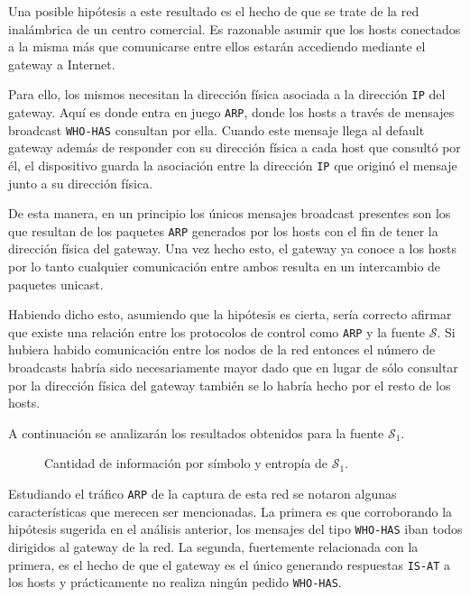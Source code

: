 Una posible hipótesis a este resultado es el hecho de que se trate de la red
inalámbrica de un centro comercial. Es razonable asumir que los hosts conectados
a la misma más que comunicarse entre ellos estarán accediendo mediante el
gateway a Internet.

Para ello, los mismos necesitan la dirección física asociada a la dirección
\texttt{IP} del gateway. Aquí es donde entra en juego \texttt{ARP}, donde los
hosts a través de mensajes broadcast \texttt{WHO-HAS} consultan por ella. Cuando
este mensaje llega al default gateway además de responder con su dirección
física a cada host que consultó por él, el dispositivo guarda la asociación
entre la dirección \texttt{IP} que originó el mensaje junto a su dirección física.

De esta manera, en un principio los únicos mensajes broadcast presentes son los
que resultan de los paquetes \texttt{ARP} generados por los hosts con el fin de
tener la dirección física del gateway. Una vez hecho esto, el gateway ya conoce
a los hosts por lo tanto cualquier comunicación entre ambos resulta en un
intercambio de paquetes unicast.

Habiendo dicho esto, asumiendo que la hipótesis es cierta, sería correcto
afirmar que existe una relación entre los protocolos de control como
\texttt{ARP} y la fuente $\mathcal{S}$. Si hubiera habido comunicación entre los
nodos de la red entonces el número de broadcasts habría sido necesariamente
mayor dado que en lugar de sólo consultar por la dirección física del gateway
también se lo habría hecho por el resto de los hosts.

A continuación se analizarán los resultados obtenidos para la fuente
$\mathcal{S}_1$.

\begin{figure}[h]
	\caption{Cantidad de información por símbolo y entropía de $\mathcal{S}_1$.}
    \label{res:esc2:fig2}
\end{figure}

Estudiando el tráfico \texttt{ARP} de la captura de esta red se notaron algunas
características que merecen ser mencionadas. La primera es que corroborando la
hipótesis sugerida en el análisis anterior, los mensajes del tipo
\texttt{WHO-HAS} iban todos dirigidos al gateway de la red. La segunda,
fuertemente relacionada con la primera, es el hecho de que el gateway es el
único generando respuestas \texttt{IS-AT} a los hosts y prácticamente no realiza
ningún pedido \texttt{WHO-HAS}.

